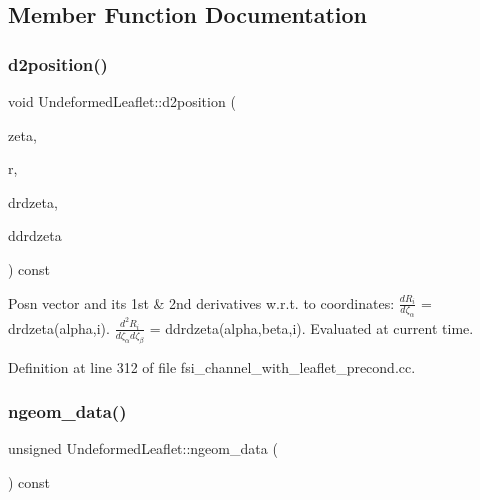 \subsection{Member Function Documentation}
\mbox{\label{classUndeformedLeaflet_a47d674756ce22e00a44ca0bd030a99da}} 
\subsubsection{\texorpdfstring{d2position()}{d2position()}}
{\footnotesize\ttfamily void Undeformed\+Leaflet\+::d2position (\begin{DoxyParamCaption}\item[{const Vector$<$ double $>$ \&}]{zeta,  }\item[{Vector$<$ double $>$ \&}]{r,  }\item[{Dense\+Matrix$<$ double $>$ \&}]{drdzeta,  }\item[{Rank\+Three\+Tensor$<$ double $>$ \&}]{ddrdzeta }\end{DoxyParamCaption}) const\hspace{0.3cm}{\ttfamily [inline]}}



Posn vector and its 1st \& 2nd derivatives w.\+r.\+t. to coordinates\+: $ \frac{dR_i}{d \zeta_\alpha}$ = drdzeta(alpha,i). $ \frac{d^2R_i}{d \zeta_\alpha d \zeta_\beta}$ = ddrdzeta(alpha,beta,i). Evaluated at current time. 



Definition at line 312 of file fsi\+\_\+channel\+\_\+with\+\_\+leaflet\+\_\+precond.\+cc.

\mbox{\label{classUndeformedLeaflet_a56153a1d117dd41657183655de094d3e}} 
\subsubsection{\texorpdfstring{ngeom\+\_\+data()}{ngeom\_data()}}
{\footnotesize\ttfamily unsigned Undeformed\+Leaflet\+::ngeom\+\_\+data (\begin{DoxyParamCaption}{ }\end{DoxyParamCaption}) const\hspace{0.3cm}{\ttfamily [inline]}}



